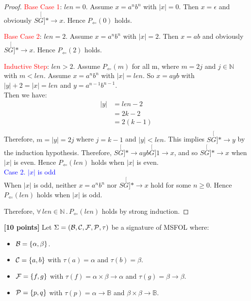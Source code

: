 \documentclass[11pt,fleqn]{article}
\newcommand{\sB}{\mbox{$\cal B$}}
\newcommand{\sC}{\mbox{$\cal C$}}
\newcommand{\sF}{\mbox{$\cal F$}}
\newcommand{\sP}{\mbox{$\cal P$}}
\newcommand{\set}[1]{{\{ #1 \}}}
\newcommand{\ForallApp}{\forall\,}
\newcommand{\mdot}{\mathrel.}
\newcommand{\der}[2]{\stackrel[#2]{#1}{\longrightarrow}}
\begin{document}
\begin{proof}
\textcolor{red}{Base Case 1}: $len = 0$. Assume $x = a^nb^n$ with $|x| = 0$. 
Then $x = \epsilon$ and obviously $S \der{*}{G} x$. 
Hence $P_{\Leftarrow}(0)$ holds.

\textcolor{red}{Base Case 2}: $len = 2$. Assume $x = a^nb^n$ with $|x| = 2$. 
Then $x = ab$ and obviously $S \der{*}{G} x$. 
Hence $P_{\Leftarrow}(2)$ holds.

\textcolor{red}{Inductive Step}: $len > 2$. Assume $P_{\Leftarrow}(m)$ for all m, 
where $m = 2j$ and $j \in \mathbb{N}$ with $m < len$. 
Assume $x = a^nb^n$ with $|x| = len$.  So $x = ayb$ with $|y| + 2 = |x| = len$ and $y = a^{n-1}b^{n-1}$. \\
Then we have:
\begin{align}
|y| &= len - 2  \tag*{$|y| + 2 = len$; arithmetic} \\
  &= 2k - 2 \tag*{$len = 2k$} \\
  &= 2(k - 1) \tag*{Arithmetic} \\
\end{align}
Therefore, $m = |y| = 2j$ where $j = k - 1$ and $|y| < len$.
This implies $S \der{*}{G} y$ by the induction hypothesis. 
Therefore, $S \der{*}{G} ayb \der{1}{G} x$, and so $S \der{*}{G} x$ when $|x|$ is even.  
Hence $P_{\Leftarrow}(len)$ holds when $|x|$ is even. \\

\textcolor{blue}{Case 2. $|x|$ is odd }\\

When $|x|$ is odd, neither $x = a^nb^n$ nor $S \der{*}{G} x$ hold for some $n \ge 0$.
Hence $P_{\Leftarrow}(len)$ holds when $|x|$ is odd. 

Therefore, $\ForallApp len \in \mathbb{N} \mdot P_{\Leftarrow}(len)$
holds by strong induction.
\end{proof}

  \newpage

  \item \textbf{[10 points]} Let $\Sigma = (\sB,\sC,\sF,\sP,\tau)$ be
    a signature of MSFOL where:

  \begin{itemize}

    \item[] $\sB = \set{\alpha,\beta}$.

    \item[] $\sC = \set{a,b}$ with $\tau(a) = \alpha$ and $\tau(b) = \beta$.

    \item[] $\sF = \set{f,g}$ with $\tau(f) = \alpha \times \beta
      \rightarrow \alpha$ and $\tau(g) = \beta
      \rightarrow \beta$.

    \item[] $\sP = \set{p,q}$ with $\tau(p) = \alpha \rightarrow
      \mathbb{B}$ and $\beta \times \beta \rightarrow \mathbb{B}$.

  \end{itemize}
\end{document}
